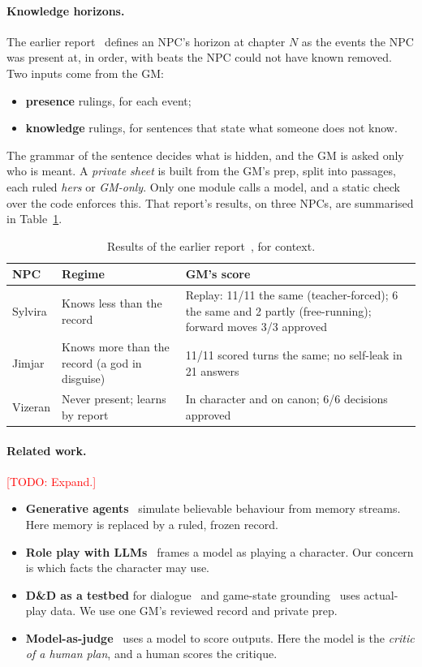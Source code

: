 \documentclass[11pt]{article}
\newcommand{\todo}[1]{\textcolor{red}{[TODO: #1]}}
\begin{document}
\paragraph{Knowledge horizons.} The earlier report~\citep{roussos2026horizon} defines an
NPC's horizon at chapter $N$ as the events the NPC was present at, in order, with beats
the NPC could not have known removed. Two inputs come from the GM:
\begin{itemize}[nosep]
\item \textbf{presence} rulings, for each event;
\item \textbf{knowledge} rulings, for sentences that state what someone does not know.
\end{itemize}
The grammar of the sentence decides what is hidden, and the GM is asked only who is meant.
A \emph{private sheet} is built from the GM's prep, split into passages, each ruled
\emph{hers} or \emph{GM-only}. Only one module calls a model, and a static check over the
code enforces this. That report's results, on three NPCs, are summarised in
Table~\ref{tab:prior}.

\begin{table}[t]
\centering
\small
\begin{tabularx}{\linewidth}{lXX}
\toprule
NPC & Regime & GM's score \\
\midrule
Sylvira & Knows less than the record & Replay: 11/11 the same (teacher-forced); 6 the same and 2 partly (free-running); forward moves 3/3 approved \\
Jimjar & Knows more than the record (a god in disguise) & 11/11 scored turns the same; no self-leak in 21 answers \\
Vizeran & Never present; learns by report & In character and on canon; 6/6 decisions approved \\
\bottomrule
\end{tabularx}
\caption{Results of the earlier report~\citep{roussos2026horizon}, for context.}
\label{tab:prior}
\end{table}

\paragraph{Related work.} \todo{Expand.}
\begin{itemize}[nosep]
\item \textbf{Generative agents}~\citep{park2023generative} simulate believable behaviour
from memory streams. Here memory is replaced by a ruled, frozen record.
\item \textbf{Role play with LLMs}~\citep{shanahan2023roleplay} frames a model as playing a
character. Our concern is which facts the character may use.
\item \textbf{D\&D as a testbed} for dialogue~\citep{callisonburch2022dnd} and game-state
grounding~\citep{zhu2023fireball} uses actual-play data. We use one GM's reviewed record
and private prep.
\item \textbf{Model-as-judge}~\citep{zheng2023judge} uses a model to score outputs. Here the
model is the \emph{critic of a human plan}, and a human scores the critique.
\end{itemize}
\end{document}

